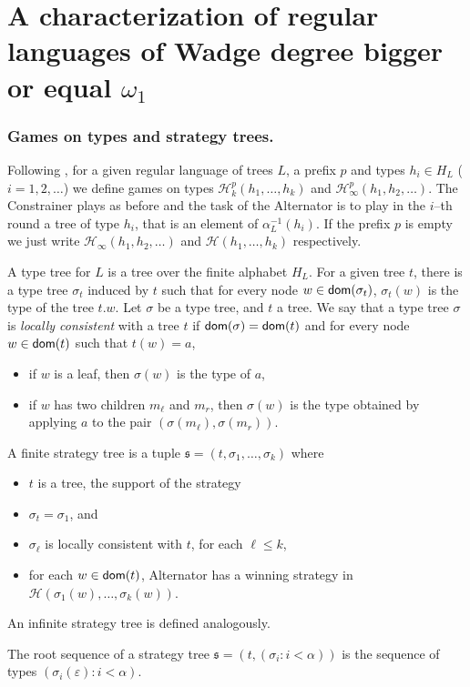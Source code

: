 
\section{A characterization of regular languages of Wadge degree bigger or equal $\omega_1$}
\subsubsection*{Games on types and strategy trees.}
Following \cite{bp}, for a given regular language of trees $L$, a prefix $p$ and types $h_i\in H_L$ ($i=1,2,\dots$) we define games on types $\mathcal{H}^p_k(h_1,\dots,h_k)$ and $\mathcal{H}^p_\infty(h_1,h_2,\dots)$. The Constrainer plays as before and the task of the Alternator is to play in the $i$--th round a tree of type $h_i$, that is an element of $\alpha_L^{-1}(h_i)$. If the prefix $p$ is empty we just write $\mathcal{H}_\infty(h_1,h_2,\dots)$ and $\mathcal{H}(h_1, \dots, h_k)$ respectively.


A type tree for $L$ is a tree over the finite alphabet $H_L$. For a given tree $t$, there is a type tree $\sigma_t$ induced by $t$ such that for every node $w \in \mathsf{dom}(\sigma_t)$, $\sigma_t(w)$ is the type of the tree $t.w$.
Let $\sigma$ be a type tree, and $t$ a tree. We say that a type tree $\sigma$ is \emph{locally consistent} with a tree $t$ if $\mathsf{dom}(\sigma)=\mathsf{dom}(t)$ and for every node $w \in \mathsf{dom}(t)$ such that $t(w)=a$, 
\begin{itemize}
\item if $w$ is a leaf, then $\sigma(w)$ is the type of $a$,
\item if $w$ has two children $m_\ell$ and $m_r$, then $\sigma(w)$ is the type obtained by applying $a$ to the pair $(\sigma(m_\ell), \sigma(m_r))$.
\end{itemize}

\begin{definition} A finite strategy tree is a tuple
$\mathfrak{s}=(t, \sigma_1, \dots, \sigma_k)$ where
\begin{itemize}
\item $t$ is a tree, the support of the strategy
\item $\sigma_t=\sigma_1$, and
\item $\sigma_\ell$ is locally consistent with $t$, for each $\ell \leq k$,
\item for each $w \in \mathsf{dom}(t)$, Alternator has a winning strategy in $\mathcal{H}(\sigma_1(w), \dots, \sigma_k(w))$.
\end{itemize}
An  infinite strategy tree is defined analogously.
\end{definition}
The root sequence of a strategy tree $\mathfrak{s}=(t, (\sigma_i : i < \alpha))$ is the sequence of types $(\sigma_i(\varepsilon): i < \alpha)$.

